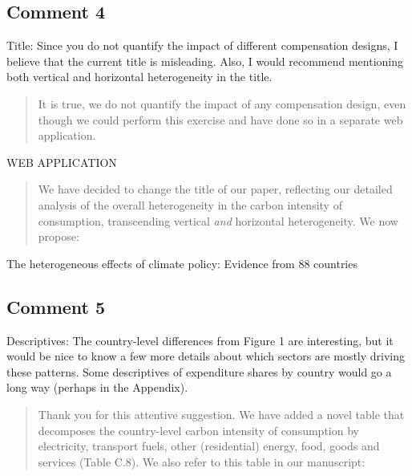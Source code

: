 \documentclass[11pt]{article}
\newenvironment{response}
{\begin{quote}\color{black}}
{\end{quote}}
\begin{document}
\subsection*{Comment 4}\label{comment_R2_4}

\begin{commentbox}
    Title: Since you do not quantify the impact of different compensation designs, I believe that the current title is misleading. Also, I would recommend mentioning both vertical and horizontal heterogeneity in the title.
\end{commentbox}

\begin{response}
    It is true, we do not quantify the impact of any compensation design, even though we could perform this exercise and have done so in a separate web application. 
\end{response}

\begin{revisionbox}
    WEB APPLICATION
\end{revisionbox}

\begin{response}
    We have decided to change the title of our paper, reflecting our detailed analysis of the overall heterogeneity in the carbon intensity of consumption, transcending vertical \textit{and} horizontal heterogeneity. We now propose:
\end{response}

\begin{revisionbox}
    The heterogeneous effects of climate policy: Evidence from 88 countries
\end{revisionbox}

\subsection*{Comment 5}\label{comment_R2_5}

\begin{commentbox}
    Descriptives: The country-level differences from Figure 1 are interesting, but it would be nice to know a few more details about which sectors are mostly driving these patterns. Some descriptives of expenditure shares by country would go a long way (perhaps in the Appendix).
\end{commentbox}

\begin{response}

    Thank you for this attentive suggestion. We have added a novel table that decomposes the country-level carbon intensity of consumption by electricity, transport fuels, other (residential) energy, food, goods and services (Table C.8). We also refer to this table in our manuscript:
\end{response}
\end{document}
